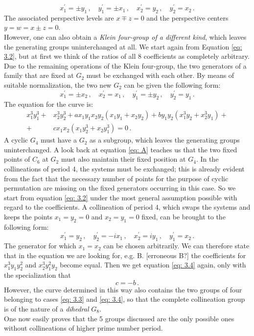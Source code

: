 \documentclass[leqno]{article}
\begin{document}
\[
x_1^\prime = \pm y_1 \, , \quad y_1^\prime = \pm x_1 \, , \quad x_2^\prime = y_2 \, , \quad y_2^\prime = x_2 \, .
\]
The associated perspective levels are $x \mp z = 0$ and the perspective centers $y=w = x \pm z=0$. \\
However, one can also obtain a \textit{Klein four-group of a different kind}, which leaves the generating groups uninterchanged at all. We start again from Equation \eqref{eq: 3.2}, but at first we think of the ratios of all 8 coefficients as completely arbitrary. Due to the remaining operations of the Klein four-group, the two generators of a family that are fixed at $G_2$ must be exchanged with each other. By means of suitable normalization, the two new $G_2$ can be given the following form:
\[
x_1^\prime = \pm x_2 \, , \quad x_2^\prime = x_1 \, , \quad y_1^\prime = \pm y_2 \, , \quad y_2^\prime = y_1 \, .
\]
The equation for the curve is:
\begin{align}\label{eq: 3.4}
	x_1^3 y_1^3 +& x_2^3 y_2^3 + ax_1 y_1 x_2 y_2 (x_1 y_1 + x_2 y_2) + b y_1 y_2 (x_1^3 y_2 + x_2^3 y_1) + \tag{4} \\ 
	+& c x_1 x_2 (x_1 y_2^3 + x_2 y_1^3) = 0 \, .  \nonumber 
\end{align}
A cyclic $G_4$ must have a $G_2$ as a subgroup, which leaves the generating groups uninterchanged. A look back at equation \eqref{eq: A} teaches us that the two fixed points of $C_6$ at $G_2$ must also maintain their fixed position at $G_4$. In the collineations of period 4, the systems must be exchanged; this is already evident from the fact that the necessary number of points for the purpose of cyclic permutation are missing on the fixed generators occurring in this case. So we start from equation \eqref{eq: 3.2} under the most general assumption possible with regard to the coefficients. A collineation of period 4, which swaps the systems and keeps the points $x_1 = y_2 =0$ and $x_2 = y_1 = 0$ fixed, can be brought to the following form:
\[
x_1^\prime = y_2 \, , \quad y_2^\prime = -ix_1 \, , \quad x_2^\prime = iy_1 \, , \quad y_1^\prime = x_2 \, .
\]
 The generator for which $x_1=x_2$ can be chosen arbitrarily. We can therefore state that in the equation we are looking for, e.g. B. [erroneous B?] the coefficients for $x_1^3 y_1 y_2^2$ and $x_2^3 y_1^2 y_2$ become equal. Then we get equation \eqref{eq: 3.4} again, only with the specialization that
\begin{equation}\label{eq: 3.5}
c = -b \, . \tag{5} 
\end{equation}
However, the curve determined in this way also contains the two groups of four belonging to cases \eqref{eq: 3.3} and \eqref{eq: 3.4}, so that the complete collineation group is of the nature of a \textit{dihedral} $G_8$. \\
One now easily proves that the 5 groups discussed are the only possible ones without collineations of higher prime number period.
\end{document}

